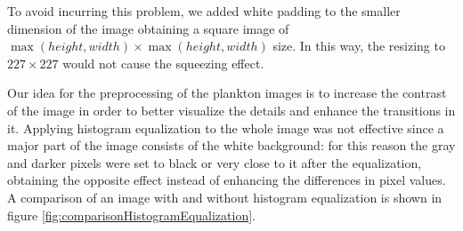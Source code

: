 \documentclass[letterpaper]{article} %
\begin{document}
To avoid incurring this problem, we added white padding to the smaller dimension of the image obtaining a square image of $\max(height, width) \times \max(height, width)$ size.
In this way, the resizing to $227 \times 227$ would not cause the squeezing effect.

Our idea for the preprocessing of the plankton images is to increase the contrast of the image in order to better visualize the details and enhance the transitions in it.
Applying histogram equalization to the whole image was not effective since a major part of the image consists of the white background: for this reason the gray and darker pixels were set to black or very close to it after the equalization, obtaining the opposite effect instead of enhancing the differences in pixel values.
A comparison of an image with and without histogram equalization is shown in figure \ref{fig:comparisonHistogramEqualization}.
\end{document}
